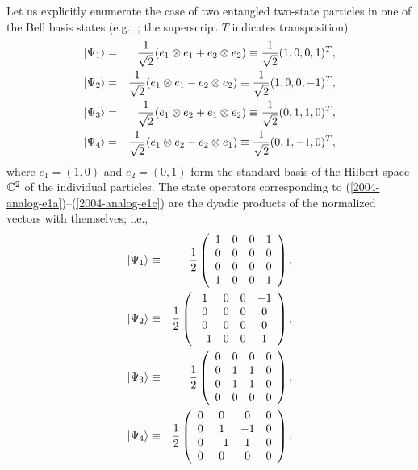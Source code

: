\documentclass[pra,showpacs,showkeys,amsfonts]{revtex4}
\begin{document}
Let us explicitly enumerate the case of two entangled two-state particles in
one of the Bell basis states (e.g., \cite{horo-96};  the superscript $T$ indicates transposition)
\begin{eqnarray}
\vert \Psi_1 \rangle &=& {1\over \sqrt{2}}( e_1 \otimes e_1 + e_2 \otimes e_2) \equiv {1\over \sqrt{2}}(1,0,0,1)^T, \label{2004-analog-e1a}\\
\vert \Psi_2 \rangle &=& {1\over \sqrt{2}}( e_1 \otimes e_1 - e_2 \otimes e_2) \equiv {1\over \sqrt{2}}(1,0,0,-1)^T, \label{2004-analog-e1b}\\
\vert \Psi_3 \rangle &=& {1\over \sqrt{2}}( e_1 \otimes e_2 + e_1 \otimes e_2) \equiv {1\over \sqrt{2}}(0,1,1,0)^T, \label{2004-analog-e1c}\\
\vert \Psi_4 \rangle &=& {1\over \sqrt{2}}( e_1 \otimes e_2 - e_2 \otimes e_1) \equiv {1\over \sqrt{2}}(0,1,-1,0)^T,\label{2004-analog-e1d}
\end{eqnarray}
where $e_1=(1,0)$ and $e_2=(0,1)$ form the standard basis of the Hilbert space
${\Bbb C}^2$
of the individual particles.
The state operators corresponding to
(\ref{2004-analog-e1a})--(\ref{2004-analog-e1c})
are the dyadic products of the normalized vectors with themselves; i.e.,
\begin{eqnarray}
\vert \Psi_1 \rangle &\equiv &{1\over {2}}
\left(
\begin{array}{cccc}
1&0&0&1\\
0&0&0&0\\
0&0&0&0\\
1&0&0&1
\end{array}
\right)
, \label{2004-analog-e2a}\\
\vert \Psi_2 \rangle &\equiv &{1\over {2}}
\left(
\begin{array}{cccc}
1&0&0&-1\\
0&0&0&0\\
0&0&0&0\\
-1&0&0&1
\end{array}
\right)
, \label{2004-analog-e2b}\\
\vert \Psi_3 \rangle &\equiv &{1\over {2}}
\left(
\begin{array}{cccc}
0&0&0&0\\
0&1&1&0\\
0&1&1&0\\
0&0&0&0
\end{array}
\right)
, \label{2004-analog-e2c}\\
\vert \Psi_4 \rangle &\equiv &{1\over {2}}
\left(
\begin{array}{cccc}
0&0&0&0\\
0&1&-1&0\\
0&-1&1&0\\
0&0&0&0
\end{array}
\right)
. \label{2004-analog-e2d}
\end{eqnarray}
\end{document}
